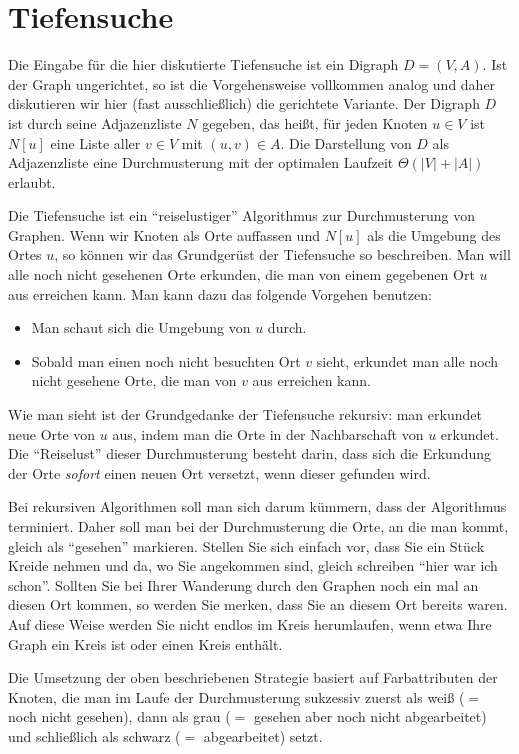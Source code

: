 \section{Tiefensuche}
\label{sect:tiefensuche}


\begin{bem} 
Die Eingabe für die hier diskutierte Tiefensuche ist ein Digraph $D=(V,A)$.
Ist der Graph ungerichtet, so ist die Vorgehensweise vollkommen analog und daher diskutieren wir hier (fast ausschließlich) die gerichtete Variante.
Der Digraph $D$ ist durch seine Adjazenzliste $N$ gegeben, das heißt, für jeden Knoten $u \in V$ ist $N[u]$ eine Liste aller $v \in V$ mit $(u,v) \in A$.
Die Darstellung von $D$ als Adjazenzliste eine Durchmusterung mit der optimalen Laufzeit $\Theta(|V|+|A|)$ erlaubt.
\end{bem}


\begin{bem} 
	Die Tiefensuche ist ein ``reiselustiger'' Algorithmus zur Durchmusterung von Graphen. Wenn wir Knoten als Orte auffassen und $N[u]$ als die Umgebung des Ortes $u$, so können wir das Grundgerüst der Tiefensuche so beschreiben. Man will alle noch nicht gesehenen Orte erkunden, die man von einem gegebenen Ort $u$ aus erreichen kann. Man kann dazu das folgende Vorgehen benutzen: 
	\begin{itemize} 
			\item Man schaut sich die Umgebung von $u$ durch. 
			\item Sobald man einen  noch nicht besuchten Ort $v$ sieht, erkundet man alle noch nicht gesehene Orte, die man von $v$ aus erreichen kann. 
	\end{itemize} 
	Wie man sieht ist der Grundgedanke  der Tiefensuche rekursiv: man erkundet neue Orte von $u$ aus, indem man die Orte in der Nachbarschaft von $u$ erkundet. Die ``Reiselust'' dieser Durchmusterung besteht darin, dass sich die Erkundung der Orte \emph{sofort} einen neuen Ort versetzt, wenn dieser gefunden wird.  
	
	
	Bei rekursiven Algorithmen soll man sich darum kümmern, dass der Algorithmus terminiert. Daher soll man bei der Durchmusterung die Orte, an die man kommt, gleich als ``gesehen'' markieren.  Stellen Sie sich einfach vor, dass Sie ein Stück Kreide nehmen und da, wo Sie angekommen sind, gleich schreiben ``hier war ich schon''. Sollten Sie bei Ihrer Wanderung durch den Graphen noch ein mal an diesen Ort kommen,  so werden Sie merken, dass Sie an diesem Ort bereits waren. Auf diese Weise werden Sie nicht endlos im Kreis herumlaufen, wenn etwa Ihre Graph ein Kreis ist oder einen Kreis enthält. 
	
	Die Umsetzung der oben beschriebenen Strategie basiert auf Farbattributen der Knoten, die man im Laufe der Durchmusterung sukzessiv zuerst als weiß ($=$ noch nicht gesehen), dann als  grau ($=$ gesehen aber noch nicht abgearbeitet) und schließlich als  schwarz ($=$ abgearbeitet) setzt. 
\end{bem}

